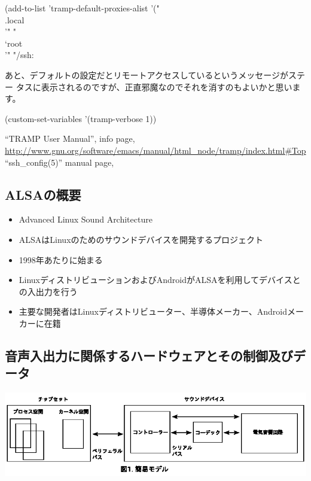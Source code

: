 \documentclass[mingoth,a4paper]{jsarticle}
\begin{document}
\begin{commandline}
 (add-to-list 'tramp-default-proxies-alist
      '("\\.local\\'" "\\`root\\'" "/ssh:%
\end{commandline}

あと、デフォルトの設定だとリモートアクセスしているというメッセージがステー
タスに表示されるのですが、正直邪魔なのでそれを消すのもよいかと思います。

\begin{commandline}
(custom-set-variables '(tramp-verbose 1))
\end{commandline}

\begin{thebibliography}{0}
  ``TRAMP User Manual'', info
	 page,
	 \url{http://www.gnu.org/software/emacs/manual/html_node/tramp/index.html#Top}
  ``ssh\_{}config(5)'' manual page,
\end{thebibliography}


\subsection{ALSAの概要}
\begin{itemize}
\item Advanced Linux Sound Architecture
\item ALSAはLinuxのためのサウンドデバイスを開発するプロジェクト
\item 1998年あたりに始まる
\item LinuxディストリビューションおよびAndroidがALSAを利用してデバイスとの入出力を行う
\item 主要な開発者はLinuxディストリビューター、半導体メーカー、Androidメーカーに在籍
\end{itemize}

\subsection{音声入出力に関係するハードウェアとその制御及びデータ}
\includegraphics[width=\hsize]{image201309/alsa_mono.png}
\end{document}

